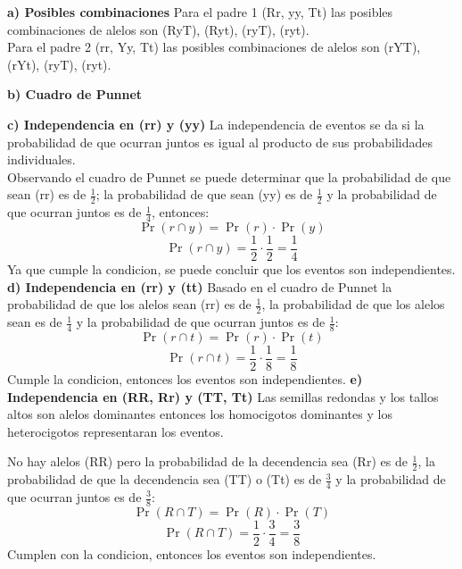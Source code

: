 \documentclass{article}
\begin{document}
\textbf{a) Posibles combinaciones}
Para el padre 1 (Rr, yy, Tt) las posibles combinaciones de alelos son (RyT), (Ryt), (ryT), (ryt). \\


Para el padre 2 (rr, Yy, Tt) las posibles combinaciones de alelos son (rYT), (rYt), (ryT), (ryt).

\textbf{b) Cuadro de Punnet}
\begin{center}
\end{center}
\textbf{c) Independencia en (rr) y (yy)}
La independencia de eventos se da si la probabilidad de que ocurran juntos es igual al producto de sus probabilidades individuales. \\


Observando el cuadro de Punnet se puede determinar que la probabilidad de que sean (rr) es de \(\frac{1}{2}\); la probabilidad de que sean (yy) es de \(\frac{1}{2}\) y la probabilidad de que ocurran juntos es de \(\frac{1}{4}\), entonces:
\[
\Pr(r \cap y) = \Pr(r) \cdot \Pr(y)
\]
\[
\Pr(r \cap y) = \frac{1}{2}  \cdot \frac{1}{2} = \frac{1}{4}
\]
Ya que cumple la condicion, se puede concluir que los eventos son independientes.
\textbf{d) Independencia en (rr) y (tt)}
Basado en el cuadro de Punnet la probabilidad de que los alelos sean (rr) es de \(\frac{1}{2}\), la probabilidad de que los alelos sean es de \(\frac{1}{4}\) y la probabilidad de que ocurran juntos es de \(\frac{1}{8}\):
\[
\Pr(r \cap t) = \Pr(r) \cdot \Pr(t)
\]
\[
\Pr(r \cap t) = \frac{1}{2} \cdot \frac{1}{8} = \frac{1}{8}
\]
Cumple la condicion, entonces los eventos son independientes.
\textbf{e) Independencia en (RR, Rr) y (TT, Tt)}
Las semillas redondas y los tallos altos son alelos dominantes entonces los homocigotos dominantes y los heterocigotos representaran los eventos.


No hay alelos (RR) pero la probabilidad de la decendencia sea (Rr) es de \(\frac{1}{2}\), la probabilidad de que la decendencia sea (TT) o (Tt) es de \(\frac{3}{4}\) y la probabilidad de que ocurran juntos es de \(\frac{3}{8}\):
\[
\Pr(R \cap T) = \Pr(R) \cdot \Pr(T)
\]
\[
\Pr(R\cap T) = \frac{1}{2} \cdot \frac{3}{4} = \frac{3}{8}
\]
Cumplen con la condicion, entonces los eventos son independientes.
\end{document}
